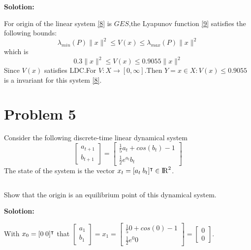 \documentclass[a4paper,11pt,reqno]{amsart}
\newcommand{\R}{{\rm I\!R}}
\newcommand{\tran}{\intercal}
\begin{document}
\textbf{Solotion:}

For origin of the linear system \ref{8} is $GES$,the Lyapunov function \ref{9} satisfies the following bounds:
\begin{equation}
    \lambda_{min}(P)\|x\|^2 \leq V(x) \leq \lambda_{max}(P)\|x\|^2
\end{equation}
which is
\begin{equation}
    0.3\|x\|^2 \leq V(x) \leq 0.9055\|x\|^2
\end{equation}
Since $V(x)$ satisfies LDC.For $V:X\rightarrow[0,\infty]$.Then $Y={x\in X:V(x)\leq 0.9055}$
is a invariant for this system \ref{8}. 
\section{Problem 5}
Consider the following discrete-time linear dynamical system
\begin{equation}
    \begin{bmatrix} a_{t+1} \\ b_{t+1} \end{bmatrix} = 
    \begin{bmatrix} \frac{1}{5}a_t+cos(b_t)-1 \\ \frac{1}{2}e^{a_t}b_t \end{bmatrix} 
    \label{12}
\end{equation}
The state of the system is the vector $x_t = [a_t \hspace{0.25em} b_t]^{\tran} \in \R^2$.
\subsection{}
Show that the origin is an equilibrium point of this dynamical system.

\textbf{Solotion:}

With $x_0 = [0 \hspace{0.25em} 0]^{\tran}$ that $ \begin{bmatrix} a_{1} \\ b_{1} \end{bmatrix} = x_1
 = \begin{bmatrix} \frac{1}{5}0+cos(0)-1 \\ \frac{1}{2}e^{0}0 \end{bmatrix} =  \begin{bmatrix} 0 \\ 0 \end{bmatrix}$.
\end{document}
